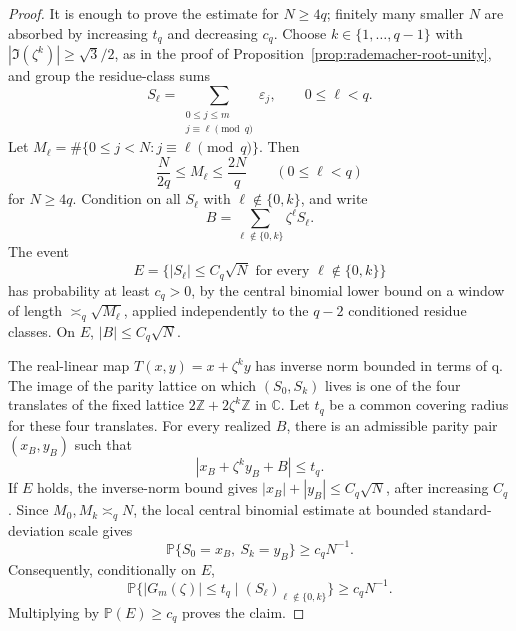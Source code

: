 \documentclass[11pt]{amsart}
\numberwithin{equation}{section}
\theoremstyle{definition}
\theoremstyle{remark}
\newcommand{\C}{\mathbb C}
\newcommand{\Prob}{\mathbb P}
\newcommand{\abs}[1]{\left\lvert #1\right\rvert}
\begin{document}
\begin{proof}
It is enough to prove the estimate for \(N\ge4q\); finitely many smaller \(N\)
are absorbed by increasing \(t_q\) and decreasing \(c_q\).  Choose
\(k\in\{1,\ldots,q-1\}\) with
\(\abs{\Im(\zeta^k)}\ge\sqrt3/2\), as in the proof of
Proposition~\ref{prop:rademacher-root-unity}, and group the residue-class sums
\[
  S_\ell=\sum_{\substack{0\le j\le m\\j\equiv \ell\pmod q}}\varepsilon_j,
  \qquad 0\le \ell<q.
\]
Let \(M_\ell=\#\{0\le j<N:j\equiv\ell\pmod q\}\).  Then
\[
  \frac{N}{2q}\le M_\ell\le \frac{2N}{q}
  \qquad(0\le\ell<q)
\]
for \(N\ge4q\).
Condition on all \(S_\ell\) with \(\ell\notin\{0,k\}\), and write
\[
  B=\sum_{\ell\notin\{0,k\}}\zeta^\ell S_\ell .
\]
The event
\[
  E=\{\abs{S_\ell}\le C_q\sqrt N\text{ for every }\ell\notin\{0,k\}\}
\]
has probability at least \(c_q>0\), by the central binomial lower bound on a
window of length \(\asymp_q\sqrt{M_\ell}\), applied independently to the
\(q-2\) conditioned residue classes.  On \(E\), \(\abs B\le C_q\sqrt N\).

The real-linear map \(T(x,y)=x+\zeta^k y\) has inverse norm bounded in terms of
q.  The image of the parity lattice on which \((S_0,S_k)\) lives is one of the
four translates of the fixed lattice \(2\mathbb Z+2\zeta^k\mathbb Z\) in \(\C\).
Let \(t_q\) be a common covering radius for these four translates.  For every
realized \(B\), there is an admissible parity pair \((x_B,y_B)\) such that
\[
  \abs{x_B+\zeta^k y_B+B}\le t_q .
\]
If \(E\) holds, the inverse-norm bound gives
\(\abs{x_B}+\abs{y_B}\le C_q\sqrt N\), after increasing \(C_q\).
Since \(M_0,M_k\asymp_q N\), the local central binomial estimate at bounded
standard-deviation scale gives
\[
  \Prob\{S_0=x_B,\ S_k=y_B\}\ge c_q N^{-1}.
\]
Consequently, conditionally on \(E\),
\[
  \Prob\{\abs{G_m(\zeta)}\le t_q\mid (S_\ell)_{\ell\notin\{0,k\}}\}
  \ge c_q N^{-1}.
\]
Multiplying by \(\Prob(E)\ge c_q\) proves the claim.
\end{proof}
\end{document}
